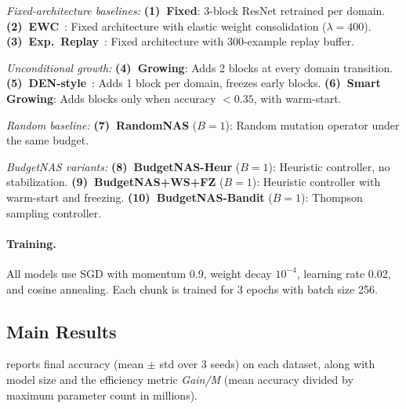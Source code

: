 \documentclass[10pt,twocolumn,letterpaper]{article}
\begin{document}
\emph{Fixed-architecture baselines:}
\textbf{(1)~Fixed}: 3-block ResNet retrained per domain.
\textbf{(2)~EWC}~\cite{kirkpatrick2017ewc}: Fixed architecture with elastic weight consolidation ($\lambda{=}400$).
\textbf{(3)~Exp.\ Replay}~\cite{chaudhry2019er}: Fixed architecture with 300-example replay buffer.

\emph{Unconditional growth:}
\textbf{(4)~Growing}: Adds 2 blocks at every domain transition.
\textbf{(5)~DEN-style}~\cite{yoon2018lifelong}: Adds 1 block per domain, freezes early blocks.
\textbf{(6)~Smart Growing}: Adds blocks only when accuracy $< 0.35$, with warm-start.

\emph{Random baseline:}
\textbf{(7)~RandomNAS} ($B{=}1$): Random mutation operator under the same budget.

\emph{BudgetNAS variants:}
\textbf{(8)~BudgetNAS-Heur} ($B{=}1$): Heuristic controller, no stabilization.
\textbf{(9)~BudgetNAS+WS+FZ} ($B{=}1$): Heuristic controller with warm-start and freezing.
\textbf{(10)~BudgetNAS-Bandit} ($B{=}1$): Thompson sampling controller.

\paragraph{Training.}
All models use SGD with momentum 0.9, weight decay $10^{-4}$, learning rate 0.02, and cosine annealing. Each chunk is trained for 3 epochs with batch size 256.

\subsection{Main Results}

 reports final accuracy (mean $\pm$ std over 3 seeds) on each dataset, along with model size and the efficiency metric \emph{Gain/M} (mean accuracy divided by maximum parameter count in millions).
\end{document}
